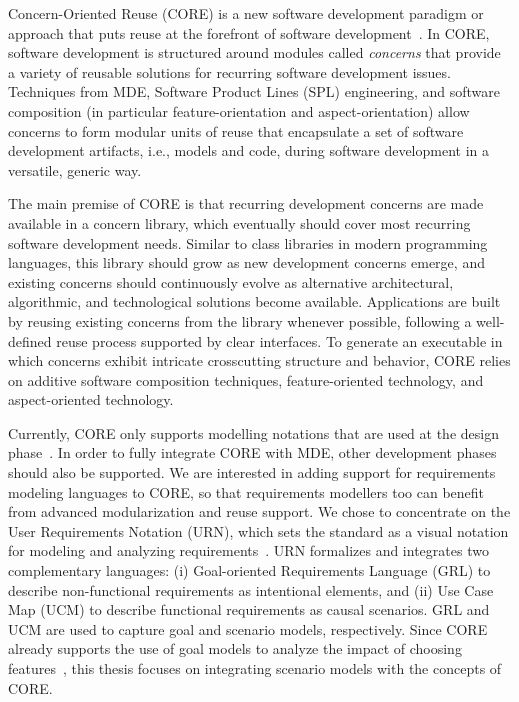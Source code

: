 Concern-Oriented Reuse (CORE) is a new software development paradigm or approach that puts reuse at the forefront of software development~\cite{alam2013concern}. In CORE, software development is structured around modules called \emph{concerns} that provide a variety of reusable solutions for recurring software development issues. Techniques from MDE, Software Product Lines (SPL) engineering, and software composition (in particular feature-orientation and aspect-orientation) allow concerns to form modular units of reuse that encapsulate a set of software development artifacts, i.e., models and code, during software development in a versatile, generic way.

The main premise of CORE is that recurring development concerns are made available in a concern library, which eventually should cover most recurring software development needs. Similar to class libraries in modern programming languages, this library should grow as new development concerns emerge, and existing concerns should continuously evolve as alternative architectural, algorithmic, and technological solutions become available. Applications are built by reusing existing concerns from the library whenever possible, following a well-defined reuse process supported by clear interfaces. To generate an executable in which concerns exhibit intricate crosscutting structure and behavior, CORE relies on additive software composition techniques, feature-oriented technology, and aspect-oriented technology.

Currently, CORE only supports modelling notations that are used at the design phase~\cite{kienzle2010aspect}. In order to fully integrate CORE with MDE, other development phases should also be supported. We are interested in adding support for requirements modeling languages to CORE, so that requirements modellers too can benefit from advanced modularization and reuse support. We chose to concentrate on the User Requirements Notation (URN), which sets the standard as a visual notation for modeling and analyzing requirements~\cite{amyot2002urn}. URN formalizes and integrates two complementary languages: (i) Goal-oriented Requirements Language (GRL) to describe non-functional requirements as intentional elements, and (ii) Use Case Map (UCM) to describe functional requirements as causal scenarios. GRL and UCM are used to capture goal and scenario models, respectively. Since CORE already supports the use of goal models to analyze the impact of choosing features~\cite{alam2013concern}, this thesis focuses on integrating scenario models with the concepts of CORE.

